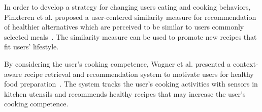 In order to develop a strategy for changing users eating and cooking behaviors, Pinxteren et al. proposed a user-centered similarity measure for recommendation of healthier alternatives which are perceived to be similar to users commonly selected meals~\cite{vanPinxteren:2011:DRS:1943403.1943422}. The similarity measure can be used to promote new recipes that fit users’ lifestyle. 

By considering the user’s cooking competence, Wagner et al. presented a context-aware recipe retrieval and recommendation system to motivate users for healthy food preparation~\cite{Wagner:2011:GSH:1961634.1961644}. The system tracks the user’s cooking activities with sensors in kitchen utensils and recommends healthy recipes that may increase the user’s cooking competence.
